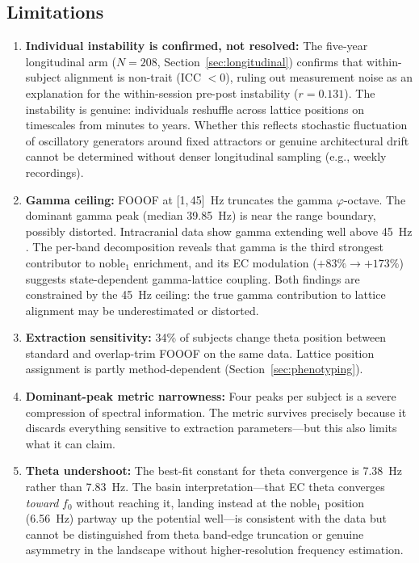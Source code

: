\documentclass[11pt,a4paper]{article}
\newcommand{\phisym}{\varphi}
\newcommand{\fzero}{f_0}
\begin{document}
\subsection{Limitations}
\label{sec:limitations}

\begin{enumerate}
    \item \textbf{Individual instability is confirmed, not resolved:} The five-year longitudinal arm ($N = 208$, Section~\ref{sec:longitudinal}) confirms that within-subject alignment is non-trait (ICC $< 0$), ruling out measurement noise as an explanation for the within-session pre-post instability ($r = 0.131$). The instability is genuine: individuals reshuffle across lattice positions on timescales from minutes to years. Whether this reflects stochastic fluctuation of oscillatory generators around fixed attractors or genuine architectural drift cannot be determined without denser longitudinal sampling (e.g., weekly recordings).
    \item \textbf{Gamma ceiling:} FOOOF at [1,\,45]~Hz truncates the gamma $\phisym$-octave. The dominant gamma peak (median 39.85~Hz) is near the range boundary, possibly distorted. Intracranial data show gamma extending well above 45~Hz \parencite{Hermes2015}. The per-band decomposition reveals that gamma is the third strongest contributor to noble$_1$ enrichment, and its EC modulation ($+83\% \to +173\%$) suggests state-dependent gamma-lattice coupling. Both findings are constrained by the 45~Hz ceiling: the true gamma contribution to lattice alignment may be underestimated or distorted.
    \item \textbf{Extraction sensitivity:} 34\% of subjects change theta position between standard and overlap-trim FOOOF on the same data. Lattice position assignment is partly method-dependent (Section~\ref{sec:phenotyping}).
    \item \textbf{Dominant-peak metric narrowness:} Four peaks per subject is a severe compression of spectral information. The metric survives precisely because it discards everything sensitive to extraction parameters---but this also limits what it can claim.
    \item \textbf{Theta undershoot:} The best-fit constant for theta convergence is 7.38~Hz rather than 7.83~Hz. The basin interpretation---that EC theta converges \textit{toward} $\fzero$ without reaching it, landing instead at the noble$_1$ position (6.56~Hz) partway up the potential well---is consistent with the data but cannot be distinguished from theta band-edge truncation or genuine asymmetry in the landscape without higher-resolution frequency estimation.

\end{enumerate}
\end{document}

